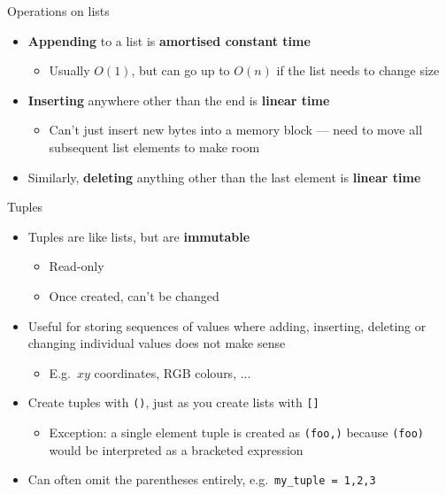 \begin{frame}{Operations on lists}
	\begin{itemize}
		\pause\item \textbf{Appending} to a list is \textbf{amortised constant time}
			\begin{itemize}
				\pause\item Usually $O(1)$, but can go up to $O(n)$ if the list needs to change size
			\end{itemize}
		\pause\item \textbf{Inserting} anywhere other than the end is \textbf{linear time}
			\begin{itemize}
				\pause\item Can't just insert new bytes into a memory block ---
					need to move all subsequent list elements to make room
			\end{itemize}
		\pause\item Similarly, \textbf{deleting} anything other than the last element is \textbf{linear time}
	\end{itemize}
\end{frame}

\begin{frame}{Tuples}
	\begin{itemize}
		\pause\item Tuples are like lists, but are \textbf{immutable}
			\begin{itemize}
				\pause\item Read-only
				\pause\item Once created, can't be changed
			\end{itemize}
		\pause\item Useful for storing sequences of values where adding, inserting, deleting or
			changing individual values does not make sense
			\begin{itemize}
				\pause\item E.g.\ $xy$ coordinates, RGB colours, ...
			\end{itemize}
		\pause\item Create tuples with \lstinline{()}, just as you create lists with \lstinline{[]}
			\begin{itemize}
				\pause\item Exception: a single element tuple is created as \lstinline{(foo,)}
					because \lstinline{(foo)} would be interpreted as a bracketed expression
			\end{itemize}
		\pause\item Can often omit the parentheses entirely, e.g.\ \lstinline{my_tuple = 1,2,3}
	\end{itemize}
\end{frame}

